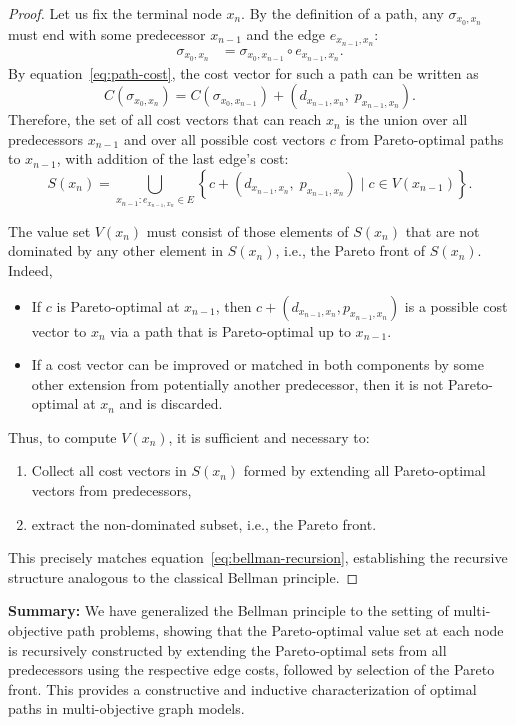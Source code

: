 \documentclass{article}
\begin{document}
\begin{proof}
Let us fix the terminal node $x_n$. By the definition of a path, any $\sigma_{x_0, x_n}$ must end with some predecessor $x_{n-1}$ and the edge $e_{x_{n-1}, x_n}$:
\begin{align*}
\sigma_{x_0, x_n} &= \sigma_{x_0, x_{n-1}} \circ e_{x_{n-1}, x_n}.
\end{align*}
By equation~\eqref{eq:path-cost}, the cost vector for such a path can be written as
\begin{equation}\label{eq:cost-recursion}
C(\sigma_{x_0, x_n}) = C(\sigma_{x_0, x_{n-1}}) + (d_{x_{n-1}, x_n},\; p_{x_{n-1}, x_n}).
\end{equation}
Therefore, the set of all cost vectors that can reach $x_n$ is the union over all predecessors $x_{n-1}$ and over all possible cost vectors $c$ from Pareto-optimal paths to $x_{n-1}$, with addition of the last edge's cost:
\begin{equation}\label{eq:all-candidates}
S(x_n) = \bigcup_{x_{n-1}: e_{x_{n-1}, x_n} \in E} \left\{ c + (d_{x_{n-1}, x_n},\; p_{x_{n-1}, x_n}) \mid c \in V(x_{n-1}) \right\}.
\end{equation}

The value set $V(x_n)$ must consist of those elements of $S(x_n)$ that are not dominated by any other element in $S(x_n)$, i.e., the Pareto front of $S(x_n)$. Indeed,  
\begin{itemize}
    \item If $c$ is Pareto-optimal at $x_{n-1}$, then $c + (d_{x_{n-1}, x_n}, p_{x_{n-1}, x_n})$ is a possible cost vector to $x_n$ via a path that is Pareto-optimal up to $x_{n-1}$.
    \item If a cost vector can be improved or matched in both components by some other extension from potentially another predecessor, then it is not Pareto-optimal at $x_n$ and is discarded.
\end{itemize}

Thus, to compute $V(x_n)$, it is sufficient and necessary to:
\begin{enumerate}
    \item Collect all cost vectors in $S(x_n)$ formed by extending all Pareto-optimal vectors from predecessors,
    \item extract the non-dominated subset, i.e., the Pareto front.
\end{enumerate}
This precisely matches equation~\eqref{eq:bellman-recursion}, establishing the recursive structure analogous to the classical Bellman principle.

\end{proof}

\textbf{Summary:}  
We have generalized the Bellman principle to the setting of multi-objective path problems, showing that the Pareto-optimal value set at each node is recursively constructed by extending the Pareto-optimal sets from all predecessors using the respective edge costs, followed by selection of the Pareto front. This provides a constructive and inductive characterization of optimal paths in multi-objective graph models.
\end{document}
